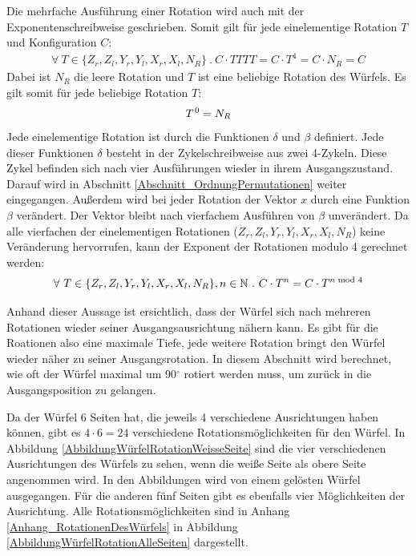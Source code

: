 \documentclass[12pt,a4paper, usenames, dvipsnames]{article}
\theoremstyle{mystyle}
\theoremstyle{definition}
\begin{document}
Die mehrfache Ausführung einer Rotation wird auch mit der Exponentenschreibweise geschrieben. 
Somit gilt für jede einelementige Rotation $T$ und Konfiguration $C$: 
\begin{align*}
\forall \ T \in \{{Z_r}, {Z_l}, {Y_r}, {Y_l}, {X_r}, {X_l} , N_R \} \ . \  C \cdot TTTT= C \cdot T^4=C \cdot N_R = C 
\end{align*} 
Dabei ist $N_R$ die leere Rotation und $T$ ist eine beliebige Rotation des Würfels. Es gilt somit für jede beliebige Rotation $T$:
\begin{align*}
T^{\hspace*{0.1em}0}=N_R
\end{align*}
Jede einelementige Rotation ist durch die Funktionen $\delta$ und $\beta$ definiert. Jede dieser Funktionen $\delta$ besteht in der Zykelschreibweise aus zwei 4-Zykeln. Diese Zykel befinden sich nach vier Ausführungen wieder in ihrem Ausgangszustand. Darauf wird in Abschnitt \ref{Abschnitt_OrdnungPermutationen} weiter eingegangen. Außerdem wird bei jeder Rotation der Vektor $x$ durch eine Funktion $\beta$ verändert. Der Vektor bleibt nach vierfachem Ausführen von $\beta$ unverändert.
Da alle vierfachen der einelementigen Rotationen (${Z_r}, {Z_l}, {Y_r}, {Y_l}, {X_r}, {X_l} , N_R$) keine Veränderung hervorrufen, kann der Exponent der Rotationen modulo 4 gerechnet werden: 
\begin{align*}
\forall \ T \in \{{Z_r}, {Z_l}, {Y_r}, {Y_l}, {X_r}, {X_l}, N_R \}, n \in \mathbb{N} \ . \ C \cdot T^n=C \cdot T^{n \hspace*{-0.3em} \mod 4}
\end{align*}

Anhand dieser Aussage ist ersichtlich, dass der Würfel sich nach mehreren Rotationen wieder seiner Ausgangsausrichtung nähern kann. Es gibt für die Roationen also eine maximale Tiefe, jede weitere Rotation bringt den Würfel wieder näher zu seiner Ausgangsrotation.
In diesem Abschnitt wird berechnet, wie oft der Würfel maximal um 90$^\circ$ rotiert werden muss, um zurück in die Ausgangsposition zu gelangen.

Da der Würfel 6 Seiten hat, die jeweils 4 verschiedene Ausrichtungen haben können, gibt es $4 \cdot 6 = 24$ verschiedene Rotationsmöglichkeiten für den Würfel. In Abbildung \ref{AbbildungWürfelRotationWeisseSeite} sind die vier verschiedenen Ausrichtungen des Würfels zu sehen, wenn die weiße Seite als obere Seite angenommen wird. In den Abbildungen wird von einem gelösten Würfel ausgegangen. Für die anderen fünf Seiten gibt es ebenfalls vier Möglichkeiten der Ausrichtung. Alle Rotationsmöglichkeiten sind in Anhang \ref{Anhang_RotationenDesWürfels} in Abbildung \ref{AbbildungWürfelRotationAlleSeiten} dargestellt.
\end{document}
